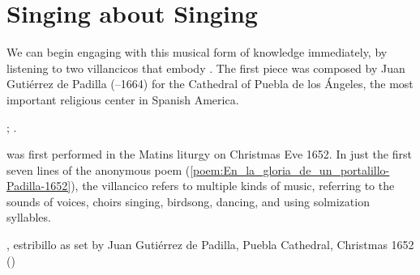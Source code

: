 \section{Singing about Singing}

We can begin engaging with this musical form of knowledge immediately, by
listening to two villancicos that embody .%
    \Autocites
    {Murata:Singing}
    {Illari:Polychoral} %
The first piece was composed by Juan Gutiérrez de Padilla (--1664)
for the Cathedral of Puebla de los Ángeles, the most important religious center
in Spanish America.%
\begin{Footnote}
    ; 
    \autocites
    {Puebla:Microfilm}
    {Stanford:Catalog}
    {Padilla:1652ChristmasCD}.
\end{Footnote}
 was first performed in the Matins liturgy
on Christmas Eve 1652.  
In just the first seven lines of the anonymous poem
(\cref{poem:En_la_gloria_de_un_portalillo-Padilla-1652}), the villancico refers
to multiple kinds of music, referring to the sounds of voices, choirs singing,
birdsong, dancing, and using solmization syllables.

{, estribillo as set by Juan Gutiérrez
de Padilla, Puebla Cathedral, Christmas 1652 
()}

